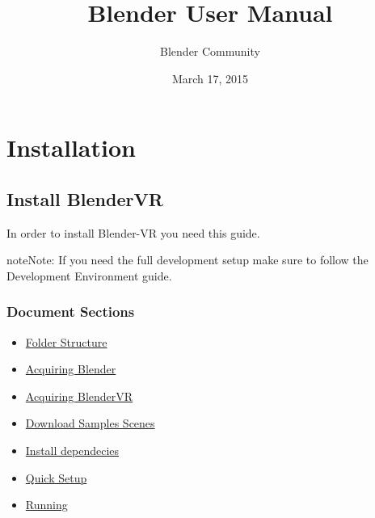\documentclass[a4,10pt,openany,oneside]{sphinxmanual}
\title{Blender User Manual}
\date{March 17, 2015}
\author{Blender Community}
\begin{document}
\maketitle
\tableofcontents
{}\label{index::doc}



\chapter{Installation}
\label{installation/index:installation}\label{installation/index:blender-vr-manual-contents}\label{installation/index::doc}

\section{Install BlenderVR}
\label{installation/installation:install-blendervr}\label{installation/installation::doc}
In order to install Blender-VR you need this guide.

\begin{notice}{note}{Note:}
If you need the full development setup make sure to follow the Development Environment guide.
\end{notice}


\subsection{Document Sections}
\label{installation/installation:document-sections}\begin{itemize}
\item {} 
{\hyperref[installation/installation:folder-structure]{Folder Structure}}

\item {} 
{\hyperref[installation/installation:acquiring-blender]{Acquiring Blender}}

\item {} 
{\hyperref[installation/installation:acquiring-blendervr]{Acquiring BlenderVR}}

\item {} 
{\hyperref[installation/installation:download-samples-scenes]{Download Samples Scenes}}

\item {} 
{\hyperref[installation/installation:install-dependecies]{Install dependecies}}

\item {} 
{\hyperref[installation/installation:quick-setup]{Quick Setup}}

\item {} 
{\hyperref[installation/installation:running]{Running}}

\end{itemize}
\end{document}
